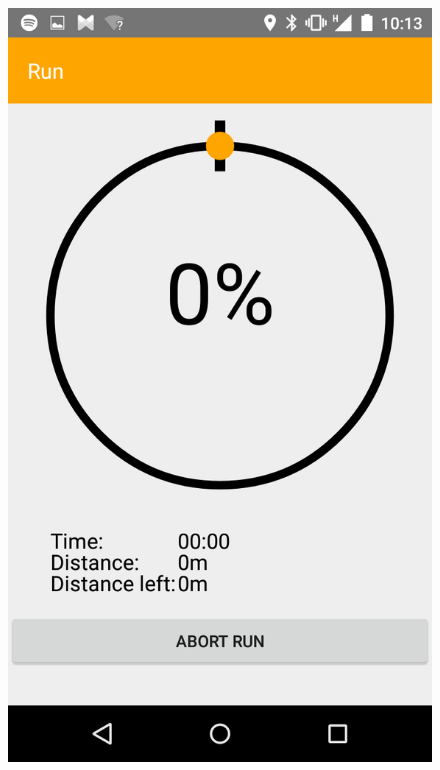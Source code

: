 \begin{figure}[!h]
\centering
\begin{minipage}{.4\textwidth}
  \centering
  \includegraphics[width=.8\linewidth]{abb/bsp/bsp11}
  \label{fig:bsp11}
\end{minipage}
\begin{minipage}{.4\textwidth}
  \centering

\end{minipage}
\end{figure}
